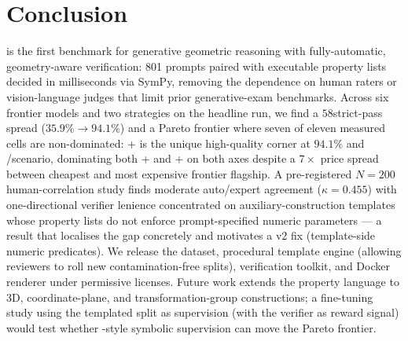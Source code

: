 \section{Conclusion}
\label{sec:conclusion}

\GeoGenBench is the first benchmark for generative geometric reasoning with fully-automatic, geometry-aware verification: 801 prompts paired with executable property lists decided in milliseconds via SymPy, removing the dependence on human raters or vision-language judges that limit prior generative-exam benchmarks.
Across six frontier models and two strategies on the headline run, we find a $58$\pp strict-pass spread ($35.9\% \to 94.1\%$) and a Pareto frontier where seven of eleven measured cells are non-dominated: \gpt + \structured is the unique high-quality corner at $94.1$\% and /scenario, dominating both \sonnet + \structured and \opus + \structured on both axes despite a $7\times$ price spread between cheapest and most expensive frontier flagship.
A pre-registered $N{=}200$ human-correlation study finds moderate auto/expert agreement ($\kappa{=}0.455$) with one-directional verifier lenience concentrated on auxiliary-construction templates whose property lists do not enforce prompt-specified numeric parameters --- a result that localises the gap concretely and motivates a v2 fix (template-side numeric predicates).
We release the dataset, procedural template engine (allowing reviewers to roll new contamination-free splits), verification toolkit, and Docker renderer under permissive licenses.
Future work extends the property language to 3D, coordinate-plane, and transformation-group constructions; a fine-tuning study using the templated split as supervision (with the verifier as reward signal) would test whether \GeoGenBench-style symbolic supervision can move the Pareto frontier.
